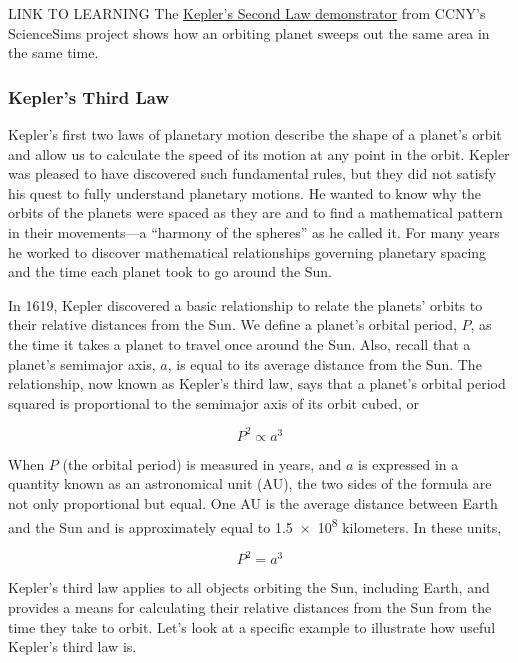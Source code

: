 \documentclass[../../main-astronomy.tex]{subfiles}
\begin{document}
\begin{gradient}{LINK TO LEARNING}
    The \href{https://openstax.org/l/30kepsecond}{Kepler's Second Law demonstrator} from CCNY's ScienceSims project shows how an orbiting planet sweeps out the same area in the same time.
\end{gradient}

\subsubsection*{Kepler's Third Law}

Kepler's first two laws of planetary motion describe the shape of a planet's orbit and allow us to calculate the speed of its motion at any point in the orbit. Kepler was pleased to have discovered such fundamental rules, but they did not satisfy his quest to fully understand planetary motions. He wanted to know why the orbits of the planets were spaced as they are and to find a mathematical pattern in their movements---a ``harmony of the spheres'' as he called it. For many years he worked to discover mathematical relationships governing planetary spacing and the time each planet took to go around the Sun.

\vspace{1em}

In 1619, Kepler discovered a basic relationship to relate the planets' orbits to their relative distances from the Sun. We define a planet's \gls{orbital period}, $P$, as the time it takes a planet to travel once around the Sun. Also, recall that a planet's semimajor axis, $a$, is equal to its average distance from the Sun. The relationship, now known as Kepler's third law, says that a planet's orbital period squared is proportional to the semimajor axis of its orbit cubed, or

\begin{equation*}
    P^2 \propto a^3
\end{equation*}

When $P$ (the orbital period) is measured in years, and $a$ is expressed in a quantity known as an \gls{astronomical unit} (AU), the two sides of the formula are not only proportional but equal. One AU is the average distance between Earth and the Sun and is approximately equal to \SI{1.5e8}{} kilometers. In these units,

\begin{equation*}
    P^2 = a^3
\end{equation*}

Kepler's third law applies to all objects orbiting the Sun, including Earth, and provides a means for calculating their relative distances from the Sun from the time they take to orbit. Let's look at a specific example to illustrate how useful Kepler's third law is.
\end{document}
